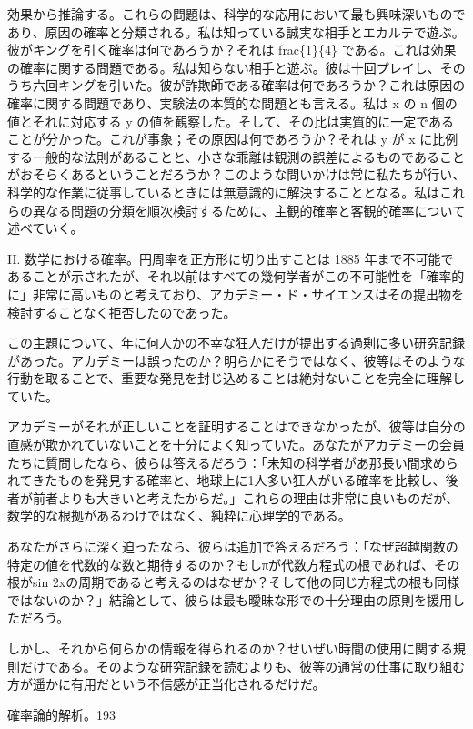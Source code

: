 \documentclass[a4paper,11pt,openany]{ltjsbook}
\begin{document}
効果から推論する。これらの問題は、科学的な応用において最も興味深いものであり、原因の確率と分類される。私は知っている誠実な相手とエカルテで遊ぶ。彼がキングを引く確率は何であろうか？それは frac\{1\}\{4\} である。これは効果の確率に関する問題である。私は知らない相手と遊ぶ。彼は十回プレイし、そのうち六回キングを引いた。彼が詐欺師である確率は何であろうか？これは原因の確率に関する問題であり、実験法の本質的な問題とも言える。私は x の n 個の値とそれに対応する y の値を観察した。そして、その比は実質的に一定であることが分かった。これが事象；その原因は何であろうか？それは y が x に比例する一般的な法則があることと、小さな乖離は観測の誤差によるものであることがおそらくあるということだろうか？このような問いかけは常に私たちが行い、科学的な作業に従事しているときには無意識的に解決することとなる。私はこれらの異なる問題の分類を順次検討するために、主観的確率と客観的確率について述べていく。

II. 数学における確率。円周率を正方形に切り出すことは 1885 年まで不可能であることが示されたが、それ以前はすべての幾何学者がこの不可能性を「確率的に」非常に高いものと考えており、アカデミー・ド・サイエンスはその提出物を検討することなく拒否したのであった。

この主題について、年に何人かの不幸な狂人だけが提出する過剰に多い研究記録があった。アカデミーは誤ったのか？明らかにそうではなく、彼等はそのような行動を取ることで、重要な発見を封じ込めることは絶対ないことを完全に理解していた。

アカデミーがそれが正しいことを証明することはできなかったが、彼等は自分の直感が欺かれていないことを十分によく知っていた。あなたがアカデミーの会員たちに質問したなら、彼らは答えるだろう：「未知の科学者があ那長い間求められてきたものを発見する確率と、地球上に1人多い狂人がいる確率を比較し、後者が前者よりも大きいと考えたからだ。」これらの理由は非常に良いものだが、数学的な根拠があるわけではなく、純粋に心理学的である。

あなたがさらに深く迫ったなら、彼らは追加で答えるだろう：「なぜ超越関数の特定の値を代数的な数と期待するのか？もしπが代数方程式の根であれば、その根がsin 2xの周期であると考えるのはなぜか？そして他の同じ方程式の根も同様ではないのか？」結論として、彼らは最も曖昧な形での十分理由の原則を援用しただろう。

しかし、それから何らかの情報を得られるのか？せいぜい時間の使用に関する規則だけである。そのような研究記録を読むよりも、彼等の通常の仕事に取り組む方が遥かに有用だという不信感が正当化されるだけだ。

確率論的解析。193
\end{document}
